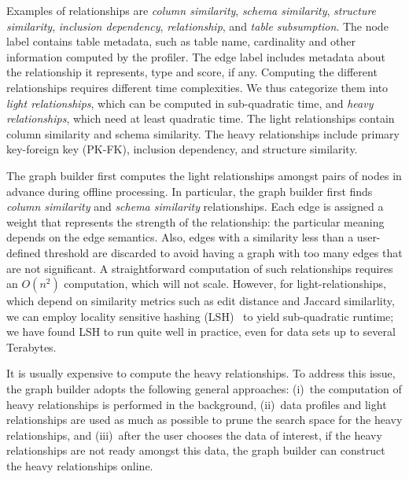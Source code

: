 Examples of relationships are 
\emph{column similarity}, 
\emph{schema similarity}, 
\emph{structure similarity}, %
\emph{inclusion dependency}, 
\emph{\pkfk relationship}, and
\emph{table subsumption}. 
The node label contains table metadata, such as table name, cardinality and
other information computed by the profiler. The edge label includes metadata
about the relationship it represents, \eg type and score, if any. Computing the
different relationships requires different time complexities. We thus categorize them
into \textit{light relationships}, which can be computed in sub-quadratic time,
and \textit{heavy relationships}, which need at least quadratic time. The light
relationships contain column similarity and schema similarity. The heavy
relationships include primary key-foreign key (PK-FK), inclusion dependency, and structure
similarity. 


The graph builder first computes the light relationships amongst pairs of nodes
in advance during offline processing. In particular, the graph builder first
finds \emph{column similarity} and \emph{schema similarity} relationships.  Each
edge is assigned a weight that represents the strength of the relationship: the
particular meaning depends on the edge semantics. Also, edges with a similarity
less than a user-defined threshold are discarded to avoid having a graph with
too many edges that are not significant.  A straightforward computation of such
relationships requires an $O(n^2)$ computation, which will not scale. However,
for light-relationships, which depend on similarity metrics such as edit
distance and Jaccard similarlity, we can employ locality sensitive hashing
(LSH)~\cite{DBLP:conf/compgeom/DatarIIM04} to yield sub-quadratic runtime; we
have found LSH to run quite well in practice, even for data sets up to several
Terabytes.

It is usually expensive to compute the heavy relationships. To address this
issue, the graph builder adopts the following general approaches: (i)~the
computation of heavy relationships is performed in the background, (ii)~data
profiles and light relationships are used as much as possible to prune the
search space for the heavy relationships, and (iii)~after the user chooses the
data of interest, if the heavy relationships are not ready amongst this data,
the graph builder can construct the heavy relationships online.

